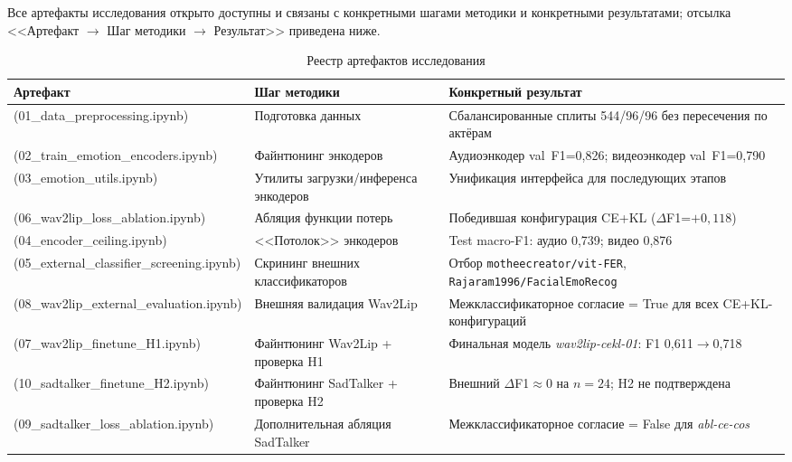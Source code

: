 \documentclass[a4paper, 12pt, oneside, openany]{article}
\begin{document}
Все артефакты исследования открыто доступны и связаны с конкретными шагами методики и конкретными результатами; отсылка <<Артефакт $\to$ Шаг методики $\to$ Результат>> приведена ниже.

\begin{table}[H]
\caption{Реестр артефактов исследования}
\label{tab:artifacts}
\centering
\small
\begin{tabular}{|p{4.7cm}|p{3.5cm}|p{6.5cm}|}
\hline
\textbf{Артефакт} & \textbf{Шаг методики} & \textbf{Конкретный результат} \\
\hline
[01\_data\_preprocessing.ipynb](01\_data\_preprocessing.ipynb) & Подготовка данных & Сбалансированные сплиты 544/96/96 без пересечения по актёрам \\
\hline
[02\_train\_emotion\_encoders.ipynb](02\_train\_emotion\_encoders.ipynb) & Файнтюнинг энкодеров & Аудиоэнкодер val~F1=0,826; видеоэнкодер val~F1=0,790 \\
\hline
[03\_emotion\_utils.ipynb](03\_emotion\_utils.ipynb) & Утилиты загрузки/инференса энкодеров & Унификация интерфейса для последующих этапов \\
\hline
[06\_wav2lip\_loss\_ablation.ipynb](06\_wav2lip\_loss\_ablation.ipynb) & Абляция функции потерь & Победившая конфигурация CE+KL ($\Delta$F1=$+0{,}118$) \\
\hline
[04\_encoder\_ceiling.ipynb](04\_encoder\_ceiling.ipynb) & <<Потолок>> энкодеров & Test macro-F1: аудио 0,739; видео 0,876 \\
\hline
[05\_external\_classifier\_screening.ipynb](05\_external\_classifier\_screening.ipynb) & Скрининг внешних классификаторов & Отбор \texttt{motheecreator/vit-FER}, \texttt{Rajaram1996/FacialEmoRecog} \\
\hline
[08\_wav2lip\_external\_evaluation.ipynb](08\_wav2lip\_external\_evaluation.ipynb) & Внешняя валидация Wav2Lip & Межклассификаторное согласие = True для всех CE+KL-конфигураций \\
\hline
[07\_wav2lip\_finetune\_H1.ipynb](07\_wav2lip\_finetune\_H1.ipynb) & Файнтюнинг Wav2Lip + проверка H1 & Финальная модель \textit{wav2lip-cekl-01}: F1 0,611$\to$0,718 \\
\hline
[10\_sadtalker\_finetune\_H2.ipynb](10\_sadtalker\_finetune\_H2.ipynb) & Файнтюнинг SadTalker + проверка H2 & Внешний $\Delta$F1$\approx 0$ на $n=24$; H2 не подтверждена \\
\hline
[09\_sadtalker\_loss\_ablation.ipynb](09\_sadtalker\_loss\_ablation.ipynb) & Дополнительная абляция SadTalker & Межклассификаторное согласие = False для \textit{abl-ce-cos} \\

\end{tabular}
\end{table}
\end{document}
